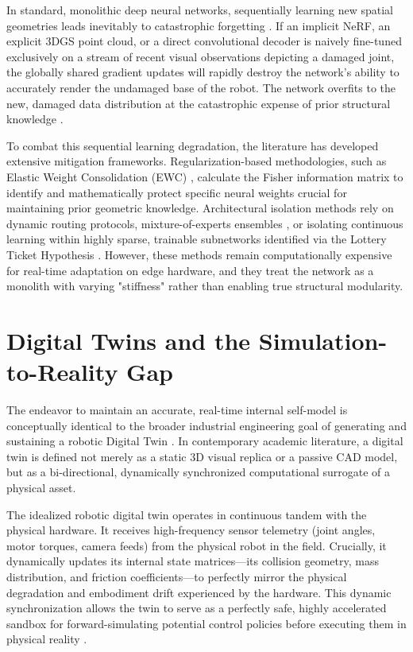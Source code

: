 \documentclass[12pt,a4paper,oneside]{report}
\begin{document}
In standard, monolithic deep neural networks, sequentially learning new spatial geometries leads inevitably to catastrophic forgetting \cite{mccloskey1989catastrophic, french1999catastrophic}. If an implicit NeRF, an explicit 3DGS point cloud, or a direct convolutional decoder is naively fine-tuned exclusively on a stream of recent visual observations depicting a damaged joint, the globally shared gradient updates will rapidly destroy the network's ability to accurately render the undamaged base of the robot. The network overfits to the new, damaged data distribution at the catastrophic expense of prior structural knowledge \cite{kirkpatrick2017overcoming}.

To combat this sequential learning degradation, the literature has developed extensive mitigation frameworks. Regularization-based methodologies, such as Elastic Weight Consolidation (EWC) \cite{kirkpatrick2017overcoming}, calculate the Fisher information matrix to identify and mathematically protect specific neural weights crucial for maintaining prior geometric knowledge. Architectural isolation methods rely on dynamic routing protocols, mixture-of-experts ensembles \cite{mocanu2018scalable}, or isolating continuous learning within highly sparse, trainable subnetworks identified via the Lottery Ticket Hypothesis \cite{frankle2018lottery}. However, these methods remain computationally expensive for real-time adaptation on edge hardware, and they treat the network as a monolith with varying "stiffness" rather than enabling true structural modularity.

\section{Digital Twins and the Simulation-to-Reality Gap}

The endeavor to maintain an accurate, real-time internal self-model is conceptually identical to the broader industrial engineering goal of generating and sustaining a robotic Digital Twin \cite{jiang2024digitaltwin, mari2024digitaltwin}. In contemporary academic literature, a digital twin is defined not merely as a static 3D visual replica or a passive CAD model, but as a bi-directional, dynamically synchronized computational surrogate of a physical asset.

The idealized robotic digital twin operates in continuous tandem with the physical hardware. It receives high-frequency sensor telemetry (joint angles, motor torques, camera feeds) from the physical robot in the field. Crucially, it dynamically updates its internal state matrices—its collision geometry, mass distribution, and friction coefficients—to perfectly mirror the physical degradation and embodiment drift experienced by the hardware. This dynamic synchronization allows the twin to serve as a perfectly safe, highly accelerated sandbox for forward-simulating potential control policies before executing them in physical reality \cite{sun2026digitaltwin, murugesan2024digitaltwin}.
\end{document}
